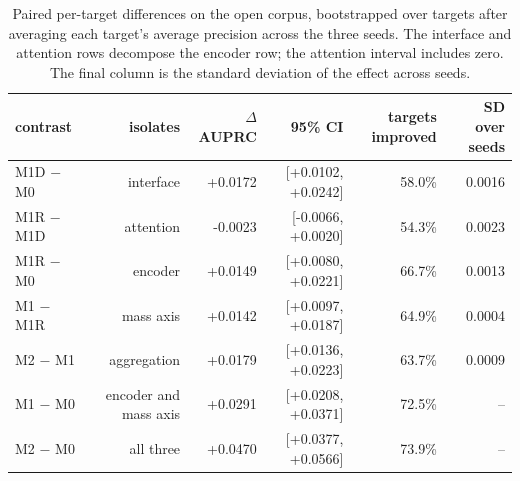 \begin{table}[htbp]
\centering
\caption{Paired per-target differences on the open corpus, bootstrapped over targets after averaging each target's average precision across the three seeds. The interface and attention rows decompose the encoder row; the attention interval includes zero. The final column is the standard deviation of the effect across seeds.}
\label{tab:table2_effects_open}
\begin{tabular}{l r r r r r}
\toprule
contrast & isolates & $\Delta$ AUPRC & 95\% CI & targets improved & SD over seeds \\
\midrule
M1D $-$ M0 & interface & +0.0172 & [+0.0102, +0.0242] & 58.0\% & 0.0016 \\
M1R $-$ M1D & attention & -0.0023 & [-0.0066, +0.0020] & 54.3\% & 0.0023 \\
M1R $-$ M0 & encoder & +0.0149 & [+0.0080, +0.0221] & 66.7\% & 0.0013 \\
M1 $-$ M1R & mass axis & +0.0142 & [+0.0097, +0.0187] & 64.9\% & 0.0004 \\
M2 $-$ M1 & aggregation & +0.0179 & [+0.0136, +0.0223] & 63.7\% & 0.0009 \\
M1 $-$ M0 & encoder and mass axis & +0.0291 & [+0.0208, +0.0371] & 72.5\% & -- \\
M2 $-$ M0 & all three & +0.0470 & [+0.0377, +0.0566] & 73.9\% & -- \\
\bottomrule
\end{tabular}
\end{table}

